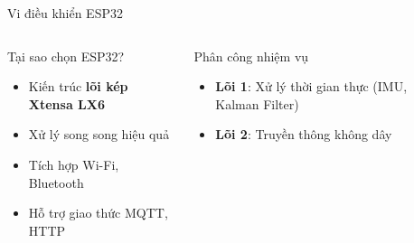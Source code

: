 \begin{frame}{Vi điều khiển ESP32}
\begin{columns}
\begin{block}{Tại sao chọn ESP32?}
\begin{itemize}
\item Kiến trúc \textbf{lõi kép Xtensa LX6}
\item Xử lý song song hiệu quả
\item Tích hợp Wi-Fi, Bluetooth
\item Hỗ trợ giao thức MQTT, HTTP
\end{itemize}
\end{block}

\begin{block}{Phân công nhiệm vụ}
\begin{itemize}
\item \textbf{Lõi 1}: Xử lý thời gian thực (IMU, Kalman Filter)
\item \textbf{Lõi 2}: Truyền thông không dây
\end{itemize}
\end{block}

\begin{center}
\end{center}
\end{columns}
\end{frame}

